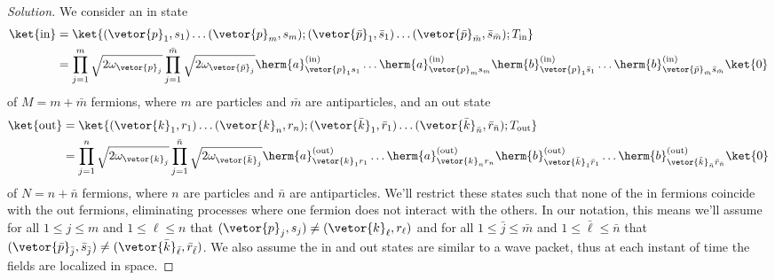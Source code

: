 \begin{proof}[Solution]
   We consider an in state
   \begin{align*}
      \ket{\mathrm{in}} &= \ket{(\vetor{p}_1, s_1) \dots (\vetor{p}_m, s_m); (\vetor{\bar{p}}_1, \bar{s}_1) \dots (\vetor{\bar{p}}_{\bar{m}}, \bar{s}_{\bar{m}}); T_{\mathrm{in}}}\\
                        &= \prod_{j = 1}^{m} \sqrt{2\omega_{\vetor{p}_j}} \prod_{j = 1}^{\bar{m}} \sqrt{2 \omega_{\vetor{\bar{p}}_j}}{\herm{a}}_{\vetor{p}_1 s_1}^{(\mathrm{in})}\dots{\herm{a}}_{\vetor{p}_m s_m}^{(\mathrm{in})}{\herm{b}}_{\vetor{p}_{1} \bar{s}_{1}}^{(\mathrm{in})}\dots{\herm{b}}_{\vetor{\bar{p}}_{\bar{m}} \bar{s}_{\bar{m}}}^{(\mathrm{in})} \ket{0}
   \end{align*}
   of \(M = m + \bar{m}\) fermions, where \(m\) are particles and \(\bar{m}\) are antiparticles, and an out state
   \begin{align*}
      \ket{\mathrm{out}} &= \ket{(\vetor{k}_1, r_1) \dots (\vetor{k}_n, r_n); (\vetor{\bar{k}}_1, \bar{r}_1) \dots (\vetor{\bar{k}}_{\bar{n}}, \bar{r}_{\bar{n}}); T_{\mathrm{out}}}\\
                         &= \prod_{j = 1}^{n} \sqrt{2\omega_{\vetor{k}_j}} \prod_{j = 1}^{\bar{n}} \sqrt{2 \omega_{\vetor{\bar{k}}_j}}{\herm{a}}_{\vetor{k}_1 r_1}^{(\mathrm{out})}\dots{\herm{a}}_{\vetor{k}_n r_n}^{(\mathrm{out})}{\herm{b}}_{\vetor{\bar{k}}_{1} \bar{r}_{1}}^{(\mathrm{out})}\dots{\herm{b}}_{\vetor{\bar{k}}_{\bar{n}} \bar{r}_{\bar{n}}}^{(\mathrm{out})} \ket{0}
   \end{align*}
   of \(N = n + \bar{n}\) fermions, where \(n\) are particles and \(\bar{n}\) are antiparticles. We'll restrict these states such that none of the in fermions coincide with the out fermions, eliminating processes where one fermion does not interact with the others. In our notation, this means we'll assume for all \(1 \leq j \leq m\) and \(1 \leq \ell \leq n\) that \((\vetor{p}_j, s_j) \neq (\vetor{k}_\ell, r_\ell)\) and for all \(1 \leq \bar{j} \leq \bar{m}\) and \(1 \leq \bar{\ell} \leq \bar{n}\) that \((\vetor{\bar{p}}_{\bar{j}}, \bar{s}_{\bar{j}}) \neq (\vetor{\bar{k}}_{\bar{\ell}}, \bar{r}_{\bar{\ell}})\). We also assume the in and out states are similar to a wave packet, thus at each instant of time the fields are localized in space.


\end{proof}
